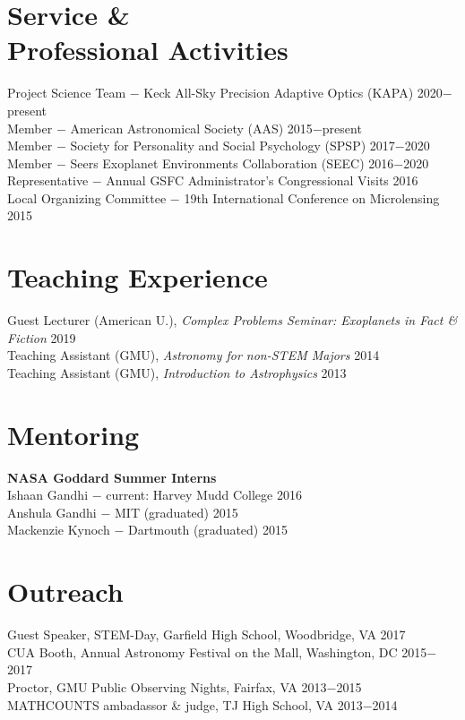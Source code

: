 \documentclass[margin,line]{res}
\begin{document}
\begin{resume}
\section{\sc Service \&\\ Professional Activities}
Project Science Team $-$ Keck All-Sky Precision Adaptive Optics (KAPA) \hfill 2020$-$present\\
Member $-$ American Astronomical Society (AAS) \hfill 2015$-$present\\
Member $-$ Society for Personality and Social Psychology (SPSP) \hfill 2017$-$2020\\
Member $-$ Seers Exoplanet Environments Collaboration (SEEC) \hfill 2016$-$2020\\
Representative $-$ Annual GSFC Administrator's Congressional Visits \hfill 2016\\
Local Organizing Committee $-$ 19th International Conference on Microlensing \hfill 2015\\

\section{\sc Teaching Experience}
Guest Lecturer (American U.), \textit{Complex Problems Seminar: Exoplanets in Fact \& Fiction} \hfill 2019 \\
Teaching Assistant (GMU), \textit{Astronomy for non-STEM Majors} \hfill 2014 \\
Teaching Assistant (GMU), \textit{Introduction to Astrophysics} \hfill 2013 \\

\section{\sc Mentoring}
\textbf{NASA Goddard Summer Interns} \\
Ishaan Gandhi $-$ current: Harvey Mudd College \hfill 2016 \\
Anshula Gandhi $-$ MIT (graduated) \hfill 2015\\
Mackenzie Kynoch $-$ Dartmouth (graduated) \hfill 2015 \\

\section{\sc Outreach}
Guest Speaker, STEM-Day, Garfield High School, Woodbridge, VA \hfill 2017 \\
CUA Booth, Annual Astronomy Festival on the Mall, Washington, DC \hfill 2015$-$2017 \\
Proctor, GMU Public Observing Nights, Fairfax, VA \hfill 2013$-$2015 \\
MATHCOUNTS ambadassor \& judge, TJ High School, VA \hfill 2013$-$2014 \\


\end{resume}
\end{document}
